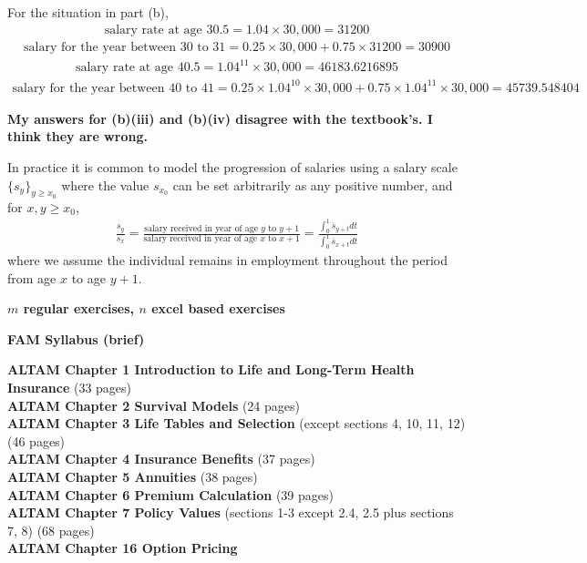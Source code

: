 \documentclass[hidelinks, 12pt]{article}
\theoremstyle{mydefstyle}
\theoremstyle{mythmstyle}
\begin{document}
For the situation in part (b),
\begin{gather*}
\mbox{salary rate at age 30.5} = 1.04 \times 30,000 = 31200
\end{gather*}
\begin{gather*}
\mbox{salary for the year between 30 to 31} = 0.25 \times 30,000 + 0.75 \times 31200 = 30900
\end{gather*}
\begin{gather*}
\mbox{salary rate at age 40.5} = 1.04^{11} \times 30,000 = 46183.6216895
\end{gather*}
\begin{gather*}
\mbox{salary for the year between 40 to 41} = 0.25 \times 1.04^{10} \times 30,000 + 0.75 \times 1.04^{11} \times 30,000
= 45739.548404
\end{gather*}

\color{red}
\textbf{My answers for (b)(iii) and (b)(iv) disagree with the textbook's. I think they are wrong.}
\color{black}

In practice it is common to model the progression of salaries using a salary scale $\{s_y\}_{y \ge x_0}$ where the value $s_{x_0}$ can be set arbitrarily as any positive number, and for $x, y \ge x_0$,
\begin{gather*}
\frac{s_y}{s_x} = \frac{\mbox{salary received in year of age $y$ to $y+1$}}{\mbox{salary received in year of age $x$ to $x+1$}}
= \frac{\int_0^1 \overline{s}_{y+t} dt}{\int_0^1 \overline{s}_{x+t} dt}
\end{gather*}
where we assume the individual remains in employment throughout the period from age $x$ to age $y+1$. 

\textbf{$m$ regular exercises, $n$ excel based exercises}

\textbf{FAM Syllabus (brief)}

\textbf{ALTAM Chapter 1 Introduction to Life and Long-Term Health Insurance} (33 pages) \\
\textbf{ALTAM Chapter 2 Survival Models} (24 pages) \\
\textbf{ALTAM Chapter 3 Life Tables and Selection} (except sections 4, 10, 11, 12) (46 pages) \\
\textbf{ALTAM Chapter 4 Insurance Benefits} (37 pages) \\
\textbf{ALTAM Chapter 5 Annuities} (38 pages) \\
\textbf{ALTAM Chapter 6 Premium Calculation} (39 pages) \\
\textbf{ALTAM Chapter 7 Policy Values} (sections 1-3 except 2.4, 2.5 plus sections 7, 8) (68 pages) \\
\textbf{ALTAM Chapter 16 Option Pricing}
\end{document}
